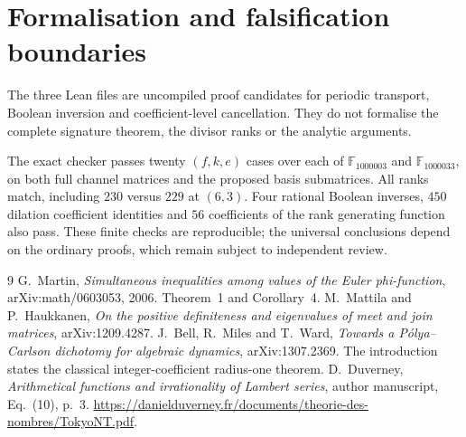 \documentclass[11pt,a4paper]{article}
\theoremstyle{definition}\newtheorem{definition}[theorem]{Definition}
\theoremstyle{remark}\newtheorem*{remark}{Remark}
\begin{document}
\section{Formalisation and falsification boundaries}

The three Lean files are uncompiled proof candidates for periodic transport,
Boolean inversion and coefficient-level cancellation. They do not formalise
the complete signature theorem, the divisor ranks or the analytic arguments.

The exact checker passes twenty $(f,k,e)$ cases over each of
$\mathbb F_{1000003}$ and $\mathbb F_{1000033}$, on both full channel matrices
and the proposed basis submatrices. All ranks match, including $230$ versus
$229$ at $(6,3)$. Four rational Boolean inverses, $450$ dilation coefficient
identities and $56$ coefficients of the rank generating function also pass.
These finite checks are reproducible; the universal conclusions depend on
the ordinary proofs, which remain subject to independent review.

\begin{thebibliography}{9}\small
{} G.~Martin, \emph{Simultaneous inequalities among values of the
Euler phi-function}, arXiv:math/0603053, 2006. Theorem~1 and Corollary~4.
 M.~Mattila and P.~Haukkanen, \emph{On the positive
definiteness and eigenvalues of meet and join matrices}, arXiv:1209.4287.
 J.~Bell, R.~Miles and T.~Ward, \emph{Towards a
P\'olya--Carlson dichotomy for algebraic dynamics}, arXiv:1307.2369.
The introduction states the classical integer-coefficient radius-one theorem.
 D.~Duverney, \emph{Arithmetical functions and irrationality
of Lambert series}, author manuscript, Eq.~(10), p.~3.
\url{https://danielduverney.fr/documents/theorie-des-nombres/TokyoNT.pdf}.
\end{thebibliography}
\end{document}
